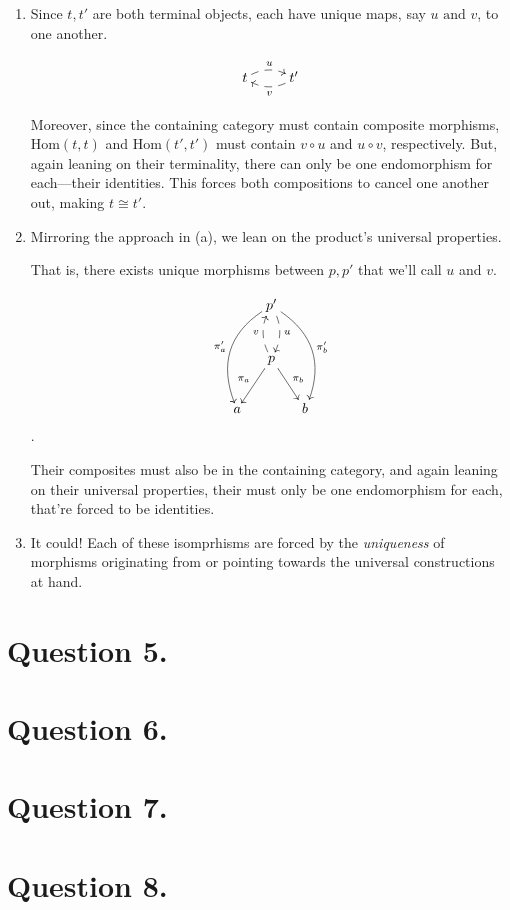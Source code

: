 \documentclass{article}
\begin{document}
\begin{enumerate}[label=(\alph*)]

\item Since $t, t'$ are both terminal objects, each have unique maps, say $u \textrm{ and } v$, to one another.

\[\xymatrix{t \ar@{-->}@/^/[r]^{u} & t' \ar@{-->}@/^/[l]^{v}}\]

Moreover, since the containing category must contain composite morphisms, $\textrm{Hom}(t, t)$ and $\textrm{Hom}(t', t')$ must contain $v \circ u$ and $u \circ v$, respectively. But, again leaning on their terminality, there can only be one endomorphism for each—their identities. This forces both compositions to cancel one another out, making $t \cong t'$.

\item Mirroring the approach in (a), we lean on the product’s universal properties.

That is, there exists unique morphisms between $p, p'$ that we’ll call $u$ and $v$.

\[
\xymatrix
@C=1pc
{
	  & p' \ar@{-->}@/^/[d]^{u} \ar@/_1.5pc/[ddl]_{\pi_a'} \ar@/^1.5pc/[ddr]^{\pi_b'} \\
	  & p \ar@{-->}@/^/[u]^{v} \ar[dl]_{\pi_a} \ar[dr]^{\pi_b} & \\
	a & & b
}
\].

Their composites must also be in the containing category, and again leaning on their universal properties, their must only be one endomorphism for each, that’re forced to be identities.

\item It could! Each of these isomprhisms are forced by the \textit{uniqueness} of morphisms originating from or pointing towards the universal constructions at hand.

\end{enumerate}

\section*{Question 5.}

\section*{Question 6.}

\section*{Question 7.}

\section*{Question 8.}
\end{document}
